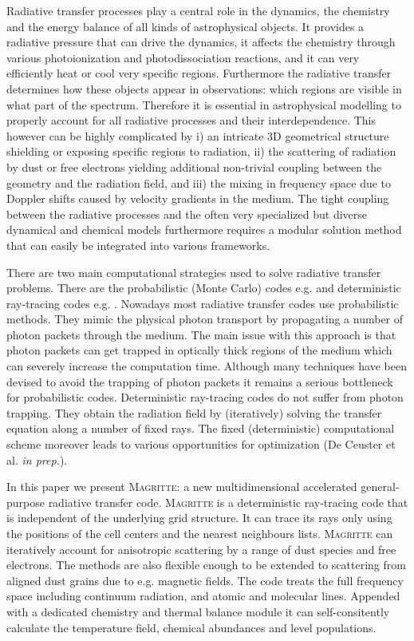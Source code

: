 \documentclass[a4paper,fleqn,usenatbib]{mnras}
\begin{document}
Radiative transfer processes play a central role in the dynamics, the chemistry and the energy balance of all kinds of astrophysical objects. It provides a radiative pressure that can drive the dynamics, it affects the chemistry through various photoionization and photodissociation reactions, and it can very efficiently heat or cool very specific regions. Furthermore the radiative transfer determines how these objects appear in observations: which regions are visible in what part of the spectrum. Therefore it is essential in astrophysical modelling to properly account for all radiative processes and their interdependence. This however can be highly complicated by i) an intricate 3D geometrical structure shielding or exposing specific regions to radiation, ii) the scattering of radiation by dust or free electrons yielding additional non-trivial coupling between the geometry and the radiation field, and iii) the mixing in frequency space due to Doppler shifts caused by velocity gradients in the medium. The tight coupling between the radiative processes and the often very specialized but diverse dynamical and chemical models furthermore requires a modular solution method that can easily be integrated into various frameworks.

There are two main computational strategies used to solve radiative transfer problems. There are the probabilistic (Monte Carlo) codes e.g. \citep{SKIRT2011, RADMC2012, CMACIONIZE2018} and deterministic ray-tracing codes e.g. \citep{SPHRAY2011, Bisbas2012}. Nowadays most radiative transfer codes use probabilistic methods. They mimic the physical photon transport by propagating a number of photon packets through the medium. The main issue with this approach is that photon packets can get trapped in optically thick regions of the medium which can severely increase the computation time. Although many techniques have been devised to avoid the trapping of photon packets it remains a serious bottleneck for probabilistic codes. Deterministic ray-tracing codes do not suffer from photon trapping. They obtain the radiation field by (iteratively) solving the transfer equation along a number of fixed rays. The fixed (deterministic) computational scheme moreover leads to various opportunities for optimization (De Ceuster et al. \textit{in prep.}).

In this paper we present \textsc{Magritte}: a new multidimensional accelerated general-purpose radiative transfer code. \textsc{Magritte} is a deterministic ray-tracing code that is independent of the underlying grid structure. It can trace its rays only using the positions of the cell centers and the nearest neighbours lists. \textsc{Magritte} can iteratively account for anisotropic scattering by a range of dust species and free electrons. The methods are also flexible enough to be extended to scattering from aligned dust grains due to e.g. magnetic fields. The code treats the full frequency space including continuum radiation, and atomic and molecular lines. Appended with a dedicated chemistry and thermal balance module it can self-consitently calculate the temperature field, chemical abundances and level populations.
\end{document}
